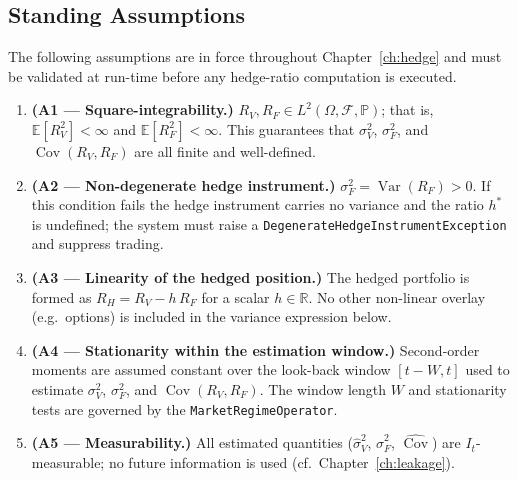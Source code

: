 \documentclass[12pt,openany]{book}
\newcommand{\R}{\mathbb{R}}
\newcommand{\calF}{\mathcal{F}}
\newcommand{\calI}{\mathcal{I}}
\newcommand{\Prob}{\mathbb{P}}
\newcommand{\E}{\mathbb{E}}
\numberwithin{equation}{chapter}
\theoremstyle{plain}
\theoremstyle{definition}
\theoremstyle{remark}
\numberwithin{equation}{chapter}
\theoremstyle{plain}
\DeclareMathOperator{\Var}{Var}
\DeclareMathOperator{\Cov}{Cov}
\def\calI{I}%
\begin{document}
\subsection{Standing Assumptions}
\label{ssec:hedge-assumptions}

The following assumptions are in force throughout
Chapter~\ref{ch:hedge} and must be validated at run-time before
any hedge-ratio computation is executed.

\begin{enumerate}
  \item \textbf{(A1 — Square-integrability.)}
        $R_V, R_F \in L^2(\Omega,\calF,\Prob)$; that is,
        $\E[R_V^2] < \infty$ and $\E[R_F^2] < \infty$.
        This guarantees that $\sigma_V^2$, $\sigma_F^2$, and
        $\Cov(R_V,R_F)$ are all finite and well-defined.

  \item \textbf{(A2 — Non-degenerate hedge instrument.)}
        $\sigma_F^2 = \Var(R_F) > 0$.
        If this condition fails the hedge instrument carries no
        variance and the ratio $h^*$ is undefined; the system must
        raise a \texttt{DegenerateHedgeInstrumentException} and
        suppress trading.

  \item \textbf{(A3 — Linearity of the hedged position.)}
        The hedged portfolio is formed as
        $R_H = R_V - h\,R_F$ for a scalar $h \in \R$.
        No other non-linear overlay (e.g.\ options) is included in
        the variance expression below.

  \item \textbf{(A4 — Stationarity within the estimation window.)}
        Second-order moments are assumed constant over the
        look-back window $[t-W, t]$ used to estimate
        $\sigma_V^2$, $\sigma_F^2$, and $\Cov(R_V,R_F)$.
        The window length $W$ and stationarity tests are
        governed by the \texttt{MarketRegimeOperator}.

  \item \textbf{(A5 — Measurability.)}
        All estimated quantities ($\hat\sigma_V^2$,
        $\hat\sigma_F^2$, $\widehat{\Cov}$) are
        $\calI_t$-measurable; no future information is used
        (cf.\ Chapter~\ref{ch:leakage}).
\end{enumerate}

\end{document}
